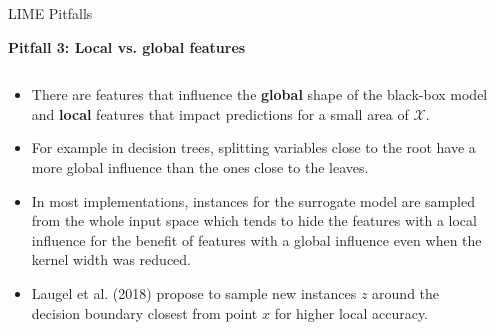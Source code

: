 \documentclass[aspectratio=169]{../latex_main/tntbeamer}  %
\begin{document}
\begin{frame}{LIME Pitfalls }

\textbf{Pitfall 3: Local vs. global features}

\begin{columns}
	\begin{column}{0.78\textwidth}
\begin{itemize}
	\item There are features that influence the \textbf{global} shape of the black-box model and \textbf{local} features that impact predictions for a small area of $\mathcal{X}$. 
	\item For example in decision trees, splitting variables close to the root have a more global influence than the ones close to the leaves. 
	\item In most implementations, instances for the surrogate model are sampled from the whole input space which tends to hide the features with a local influence for the benefit of features with a global influence even when the kernel width was reduced. 
	\item Laugel et al. (2018) propose to sample new instances $z$ around the decision boundary closest from point $x$ for higher local accuracy.
\end{itemize}
\end{column}

\begin{column}{0.2\textwidth}


\end{column}
\end{columns}
\end{frame}
\end{document}
